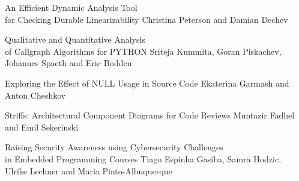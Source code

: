 \documentclass[12pt,twoside]{book}
\newcommand{\nospell}[1]{#1}
\begin{document}
  {\nospell{An Efficient Dynamic Analysis Tool \\ for Checking Durable Linearizability}}
  {\nospell{Christina Peterson and Damian Dechev}}

  {\nospell{Qualitative and Quantitative Analysis \\ of Callgraph Algorithms for PYTHON}}
  {\nospell{Sriteja Kummita, Goran Piskachev, \\ Johannes Spaeth and Eric Bodden}}

  {\nospell{Exploring the Effect of NULL Usage in Source Code}}
  {\nospell{Ekaterina Garmash and Anton Cheshkov}}

  {\nospell{Striffs: Architectural Component Diagrams for Code Reviews}}
  {\nospell{Muntazir Fadhel and Emil Sekerinski}}

  {\nospell{Raising Security Awareness using Cybersecurity Challenges \\ in Embedded Programming Courses}}
  {\nospell{Tiago Espinha Gasiba, Samra Hodzic, \\ Ulrike Lechner and Maria Pinto-Albuquerque}}

\label{ref:index}
\printindex
\thispagestyle{empty}
\end{document}
